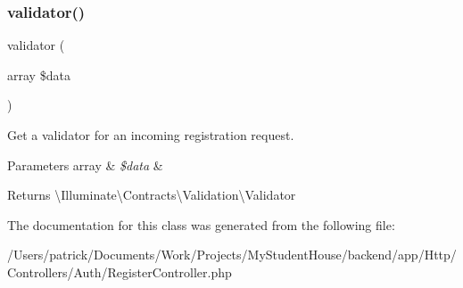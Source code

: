 \subsubsection{\texorpdfstring{validator()}{validator()}}
{\footnotesize\ttfamily validator (\begin{DoxyParamCaption}\item[{array}]{\$data }\end{DoxyParamCaption})\hspace{0.3cm}{\ttfamily [protected]}}

Get a validator for an incoming registration request.


\begin{DoxyParams}[1]{Parameters}
array & {\em \$data} & \\
\hline
\end{DoxyParams}
\begin{DoxyReturn}{Returns}
\textbackslash{}\+Illuminate\textbackslash{}\+Contracts\textbackslash{}\+Validation\textbackslash{}\+Validator 
\end{DoxyReturn}


The documentation for this class was generated from the following file\+:\begin{DoxyCompactItemize}
\item 
/\+Users/patrick/\+Documents/\+Work/\+Projects/\+My\+Student\+House/backend/app/\+Http/\+Controllers/\+Auth/Register\+Controller.\+php\end{DoxyCompactItemize}
